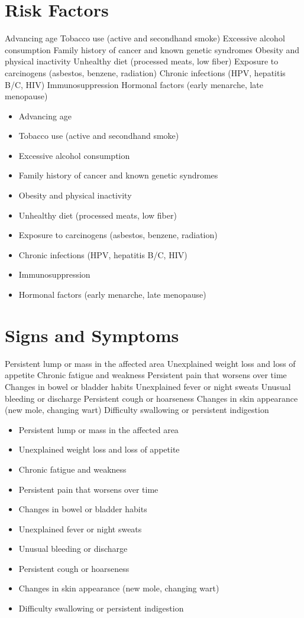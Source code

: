 \section{Risk Factors}
Advancing age Tobacco use (active and secondhand smoke) Excessive alcohol consumption Family history of cancer and known genetic syndromes Obesity and physical inactivity Unhealthy diet (processed meats, low fiber) Exposure to carcinogens (asbestos, benzene, radiation) Chronic infections (HPV, hepatitis B/C, HIV) Immunosuppression Hormonal factors (early menarche, late menopause)

\begin{itemize}[noitemsep]
  \item Advancing age
  \item Tobacco use (active and secondhand smoke)
  \item Excessive alcohol consumption
  \item Family history of cancer and known genetic syndromes
  \item Obesity and physical inactivity
  \item Unhealthy diet (processed meats, low fiber)
  \item Exposure to carcinogens (asbestos, benzene, radiation)
  \item Chronic infections (HPV, hepatitis B/C, HIV)
  \item Immunosuppression
  \item Hormonal factors (early menarche, late menopause)
\end{itemize}
\section{Signs and Symptoms}
Persistent lump or mass in the affected area Unexplained weight loss and loss of appetite Chronic fatigue and weakness Persistent pain that worsens over time Changes in bowel or bladder habits Unexplained fever or night sweats Unusual bleeding or discharge Persistent cough or hoarseness Changes in skin appearance (new mole, changing wart) Difficulty swallowing or persistent indigestion

\begin{itemize}[noitemsep]
  \item Persistent lump or mass in the affected area
  \item Unexplained weight loss and loss of appetite
  \item Chronic fatigue and weakness
  \item Persistent pain that worsens over time
  \item Changes in bowel or bladder habits
  \item Unexplained fever or night sweats
  \item Unusual bleeding or discharge
  \item Persistent cough or hoarseness
  \item Changes in skin appearance (new mole, changing wart)
  \item Difficulty swallowing or persistent indigestion
\end{itemize}

